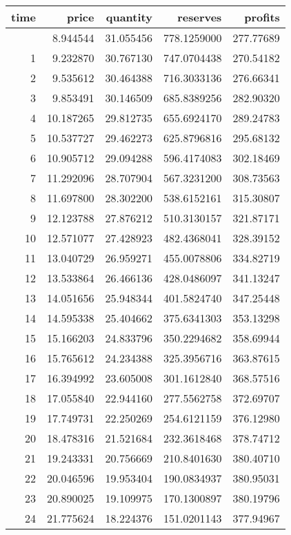 \documentclass[
]{article}
\begin{document}
\begin{longtable}[]{@{}rrrrr@{}}
\toprule\noalign{}
time & price & quantity & reserves & profits \\
\midrule\noalign{}
\endhead
\bottomrule\noalign{}
\endlastfoot
0 & 8.944544 & 31.055456 & 778.1259000 & 277.77689 \\
1 & 9.232870 & 30.767130 & 747.0704438 & 270.54182 \\
2 & 9.535612 & 30.464388 & 716.3033136 & 276.66341 \\
3 & 9.853491 & 30.146509 & 685.8389256 & 282.90320 \\
4 & 10.187265 & 29.812735 & 655.6924170 & 289.24783 \\
5 & 10.537727 & 29.462273 & 625.8796816 & 295.68132 \\
6 & 10.905712 & 29.094288 & 596.4174083 & 302.18469 \\
7 & 11.292096 & 28.707904 & 567.3231200 & 308.73563 \\
8 & 11.697800 & 28.302200 & 538.6152161 & 315.30807 \\
9 & 12.123788 & 27.876212 & 510.3130157 & 321.87171 \\
10 & 12.571077 & 27.428923 & 482.4368041 & 328.39152 \\
11 & 13.040729 & 26.959271 & 455.0078806 & 334.82719 \\
12 & 13.533864 & 26.466136 & 428.0486097 & 341.13247 \\
13 & 14.051656 & 25.948344 & 401.5824740 & 347.25448 \\
14 & 14.595338 & 25.404662 & 375.6341303 & 353.13298 \\
15 & 15.166203 & 24.833796 & 350.2294682 & 358.69944 \\
16 & 15.765612 & 24.234388 & 325.3956716 & 363.87615 \\
17 & 16.394992 & 23.605008 & 301.1612840 & 368.57516 \\
18 & 17.055840 & 22.944160 & 277.5562758 & 372.69707 \\
19 & 17.749731 & 22.250269 & 254.6121159 & 376.12980 \\
20 & 18.478316 & 21.521684 & 232.3618468 & 378.74712 \\
21 & 19.243331 & 20.756669 & 210.8401630 & 380.40710 \\
22 & 20.046596 & 19.953404 & 190.0834937 & 380.95031 \\
23 & 20.890025 & 19.109975 & 170.1300897 & 380.19796 \\
24 & 21.775624 & 18.224376 & 151.0201143 & 377.94967 \\

\end{longtable}
\end{document}
